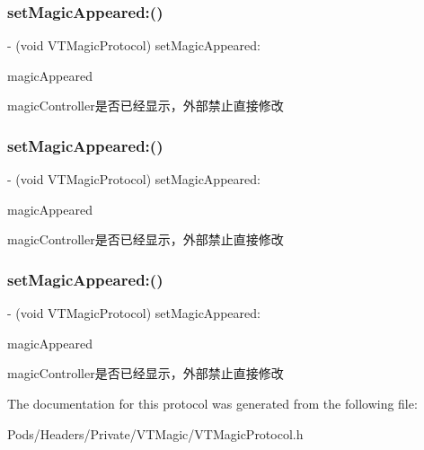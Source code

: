 \subsubsection{\texorpdfstring{set\+Magic\+Appeared\+:()}{setMagicAppeared:()}\hspace{0.1cm}{\footnotesize\ttfamily [1/3]}}
{\footnotesize\ttfamily -\/ (void V\+T\+Magic\+Protocol) set\+Magic\+Appeared\+: \begin{DoxyParamCaption}\item[{(B\+O\+OL)}]{magic\+Appeared }\end{DoxyParamCaption}\hspace{0.3cm}{\ttfamily [optional]}}

magic\+Controller是否已经显示，外部禁止直接修改 \mbox{\label{protocol_v_t_magic_protocol_01-p_a4c56f62764bbc1306d593c7a940a117d}} 
\subsubsection{\texorpdfstring{set\+Magic\+Appeared\+:()}{setMagicAppeared:()}\hspace{0.1cm}{\footnotesize\ttfamily [2/3]}}
{\footnotesize\ttfamily -\/ (void V\+T\+Magic\+Protocol) set\+Magic\+Appeared\+: \begin{DoxyParamCaption}\item[{(B\+O\+OL)}]{magic\+Appeared }\end{DoxyParamCaption}\hspace{0.3cm}{\ttfamily [optional]}}

magic\+Controller是否已经显示，外部禁止直接修改 \mbox{\label{protocol_v_t_magic_protocol_01-p_a4c56f62764bbc1306d593c7a940a117d}} 
\subsubsection{\texorpdfstring{set\+Magic\+Appeared\+:()}{setMagicAppeared:()}\hspace{0.1cm}{\footnotesize\ttfamily [3/3]}}
{\footnotesize\ttfamily -\/ (void V\+T\+Magic\+Protocol) set\+Magic\+Appeared\+: \begin{DoxyParamCaption}\item[{(B\+O\+OL)}]{magic\+Appeared }\end{DoxyParamCaption}\hspace{0.3cm}{\ttfamily [optional]}}

magic\+Controller是否已经显示，外部禁止直接修改 

The documentation for this protocol was generated from the following file\+:\begin{DoxyCompactItemize}
\item 
Pods/\+Headers/\+Private/\+V\+T\+Magic/V\+T\+Magic\+Protocol.\+h\end{DoxyCompactItemize}
